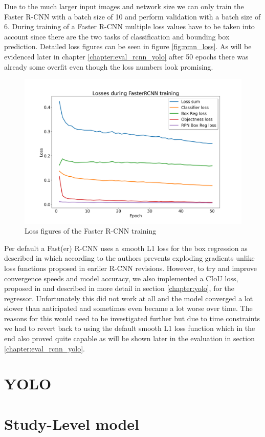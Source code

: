 Due to the much larger input images and network size we can only train the Faster R-CNN with a batch size of 10 and perform validation with a batch size of 6. During training of a Faster R-CNN multiple loss values have to be taken into account since there are the two tasks of classification and bounding box prediction. Detailed loss figures can be seen in figure \vref{fig:rcnn_loss}. As will be evidenced later in chapter \vref{chapter:eval_rcnn_yolo} after 50 epochs there was already some overfit even though the loss numbers look promising.

\begin{figure}
	\centering
	\includegraphics[width=.9\linewidth]{img/loss_fasterrcnn_50.png}
	\caption{Loss figures of the Faster R-CNN training}
	\label{fig:rcnn_loss}
\end{figure}

Per default a Fast(er) R-CNN uses a smooth L1 loss for the box regression as described in \autocite{girshick_fast_2015} which according to the authors prevents exploding gradients unlike loss functions proposed in earlier R-CNN revisions. However, to try and improve convergence speeds and model accuracy, we also implemented a \ac{CIoU} loss, proposed in \autocite{zheng_enhancing_2021} and described in more detail in section \vref{chapter:yolo}, for the regressor. Unfortunately this did not work at all and the model converged a lot slower than anticipated and sometimes even became a lot worse over time. The reasons for this would need to be investigated further but due to time constraints we had to revert back to using the default smooth L1 loss function which in the end also proved quite capable as will be shown later in the evaluation in section \vref{chapter:eval_rcnn_yolo}.

\section{YOLO}\label{chapter:yolo}

\section{Study-Level model}

